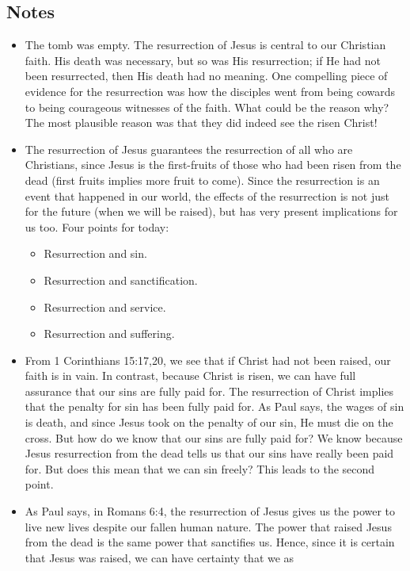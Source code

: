 \subsection*{Notes}
\begin{itemize}
  \item{The tomb was empty.  The resurrection of Jesus is central to our
  Christian faith.  His death was necessary, but so was His resurrection; if
  He had not been resurrected, then His death had no meaning. One compelling piece of evidence for the resurrection was how the disciples went from being cowards to being courageous witnesses of the faith. What could be the reason why? The most plausible reason was that they did indeed see the risen Christ!}
  \item{The resurrection of Jesus guarantees the resurrection of all who are Christians, since Jesus is the first-fruits of those who had been risen from the dead (first fruits implies more fruit to come). Since the resurrection is an event that happened in our world, the effects of the resurrection is not just for the future (when we will be raised), but has very present implications for us too. Four points for today:
  \begin{itemize}
    \item{Resurrection and sin.}
    \item{Resurrection and sanctification.}
    \item{Resurrection and service.}
    \item{Resurrection and suffering.}
  \end{itemize}
  }
  \item{From 1 Corinthians 15:17,20, we see that if Christ had not been raised, our faith is in vain. In contrast, because Christ is risen, we can have full assurance that our sins are fully paid for. The resurrection of Christ implies that the penalty for sin has been fully paid for. As Paul says, the wages of sin is death, and since Jesus took on the penalty of our sin, He must die on the cross. But how do we know that our sins are fully paid for? We know because Jesus resurrection from the dead tells us that our sins have really been paid for. But does this mean that we can sin freely? This leads to the second point.}
  \item{As Paul says, in Romans 6:4, the resurrection of Jesus gives us the
  power to live new lives despite our fallen human nature.  The power that
  raised Jesus from the dead is the same power that sanctifies us.  Hence,
  since it is certain that Jesus was raised, we can have certainty that we as
}
\end{itemize}
